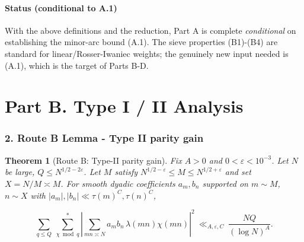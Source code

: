 \documentclass[11pt]{article}
\newtheorem{theorem}[lemma]{Theorem}
\theoremstyle{definition}
\theoremstyle{remark}
\begin{document}
\subsection*{Status (conditional to A.1)}
With the above definitions and the reduction, Part A is complete \emph{conditional} on establishing the minor-arc bound (A.1). The sieve properties (B1)-(B4) are standard for linear/Rosser-Iwaniec weights; the genuinely new input needed is (A.1), which is the target of Parts B-D.

\part*{Part B. Type I / II Analysis}

\section*{2. Route B Lemma - Type II parity gain}

\begin{theorem}[Route B: Type-II parity gain]
	Fix $A>0$ and $0<\varepsilon<10^{-3}$. Let $N$ be large, $Q\le N^{1/2-2\varepsilon}$. Let $M$ satisfy $N^{1/2-\varepsilon}\le M\le N^{1/2+\varepsilon}$ and set $X=N/M\asymp M$. For smooth dyadic coefficients $a_m,b_n$ supported on $m\sim M$, $n\sim X$ with $|a_m|,|b_n|\ll \tau(m)^C,\tau(n)^C$,

	$$
		\sum_{q\le Q}\ \sum_{\chi\bmod q}^{\!*}
		\left|\sum_{mn\asymp N} a_m b_n\,\lambda(mn)\chi(mn)\right|^2
		\ \ll_{A,\varepsilon,C}\ \frac{NQ}{(\log N)^{A}}.
	$$
\end{theorem}
\end{document}
